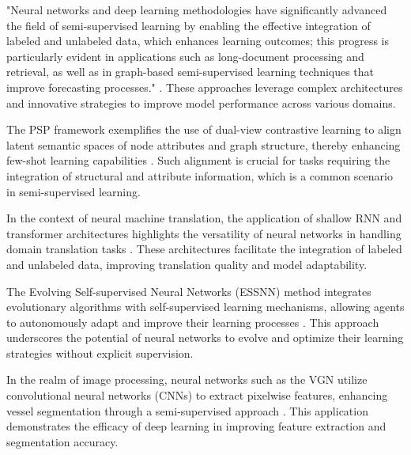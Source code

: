 "Neural networks and deep learning methodologies have significantly advanced the field of semi-supervised learning by enabling the effective integration of labeled and unlabeled data, which enhances learning outcomes; this progress is particularly evident in applications such as long-document processing and retrieval, as well as in graph-based semi-supervised learning techniques that improve forecasting processes." \cite{ginzburg2021selfsuperviseddocumentsimilarityranking,ullah2019graphconvolutionalnetworksanalysis,zhao2017multiplesourcedomainadaptation}. These approaches leverage complex architectures and innovative strategies to improve model performance across various domains.



The PSP framework exemplifies the use of dual-view contrastive learning to align latent semantic spaces of node attributes and graph structure, thereby enhancing few-shot learning capabilities \cite{ge2024psppretrainingstructureprompt}. Such alignment is crucial for tasks requiring the integration of structural and attribute information, which is a common scenario in semi-supervised learning.



In the context of neural machine translation, the application of shallow RNN and transformer architectures highlights the versatility of neural networks in handling domain translation tasks \cite{bogoychev2020domaintranslationesenoisesynthetic}. These architectures facilitate the integration of labeled and unlabeled data, improving translation quality and model adaptability.



The Evolving Self-supervised Neural Networks (ESSNN) method integrates evolutionary algorithms with self-supervised learning mechanisms, allowing agents to autonomously adapt and improve their learning processes \cite{le2019evolvingselfsupervisedneuralnetworks}. This approach underscores the potential of neural networks to evolve and optimize their learning strategies without explicit supervision.



In the realm of image processing, neural networks such as the VGN utilize convolutional neural networks (CNNs) to extract pixelwise features, enhancing vessel segmentation through a semi-supervised approach \cite{shin2018deepvesselsegmentationlearning}. This application demonstrates the efficacy of deep learning in improving feature extraction and segmentation accuracy.



